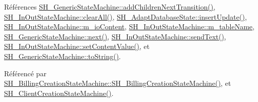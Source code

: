 Références \hyperlink{classSH__GenericStateMachine_a16d844020bc26480bd81d6b794c8364c}{S\-H\-\_\-\-Generic\-State\-Machine\-::add\-Children\-Next\-Transition()}, \hyperlink{classSH__InOutStateMachine_aa1d5860888c96ff94c55dc77e0fdfdcf}{S\-H\-\_\-\-In\-Out\-State\-Machine\-::clear\-All()}, \hyperlink{classSH__AdaptDatabaseState_a037db544ea05f42d21fcbdda758839fe}{S\-H\-\_\-\-Adapt\-Database\-State\-::insert\-Update()}, \hyperlink{classSH__InOutStateMachine_a8cfbc27eef057bf37b7711bdfef2077e}{S\-H\-\_\-\-In\-Out\-State\-Machine\-::m\-\_\-io\-Content}, \hyperlink{classSH__InOutStateMachine_aa009eecc5ab6181358faafb5996b6006}{S\-H\-\_\-\-In\-Out\-State\-Machine\-::m\-\_\-table\-Name}, \hyperlink{classSH__GenericStateMachine_af4771d31d87951c997fba1633c2d67f6}{S\-H\-\_\-\-Generic\-State\-Machine\-::next()}, \hyperlink{classSH__InOutStateMachine_a5e7f5958bae31696b6a8deab94ad2b4f}{S\-H\-\_\-\-In\-Out\-State\-Machine\-::send\-Text()}, \hyperlink{classSH__InOutStateMachine_a9ab1534306b2bdb62743d4bcefe40c17}{S\-H\-\_\-\-In\-Out\-State\-Machine\-::set\-Content\-Value()}, et \hyperlink{classSH__GenericStateMachine_a85c0c1c9d258ae991f84667412fa47cd}{S\-H\-\_\-\-Generic\-State\-Machine\-::to\-String()}.



Référencé par \hyperlink{classSH__BillingCreationStateMachine_ad62b77fa4aeafe200056ff3974562f83}{S\-H\-\_\-\-Billing\-Creation\-State\-Machine\-::\-S\-H\-\_\-\-Billing\-Creation\-State\-Machine()}, et \hyperlink{classSH__ClientCreationStateMachine_a0b406b0f404c0fd33bf35be8ce0cc811}{S\-H\-\_\-\-Client\-Creation\-State\-Machine()}.


